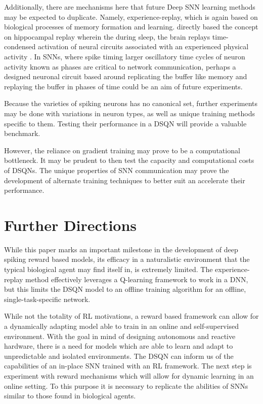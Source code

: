 \documentclass[
]{article}
\begin{document}
Additionally, there are mechanisms here that future Deep SNN learning
methods may be expected to duplicate. Namely, experience-replay, which
is again based on biological processes of memory formation and learning.
\autocite{mnihHumanlevelControlDeep2015} directly based the concept on
hippocampal replay wherein the during sleep, the brain replays
time-condensed activation of neural circuits associated with an
experienced physical activity
\autocite{bendorBiasingContentHippocampal2012}\autocite{oneillPlayItAgain2010}.
In SNNs, where spike timing larger oscillatory time cycles of neuron
activity known as phases are critical to network communication, perhaps
a designed neuronal circuit based around replicating the buffer like
memory and replaying the buffer in phases of time could be an aim of
future experiments.

Because the varieties of spiking neurons has no canonical set, further
experiments may be done with variations in neuron types, as well as
unique training methods specific to them. Testing their performance in a
DSQN will provide a valuable benchmark.

However, the reliance on gradient training may prove to be a
computational bottleneck. It may be prudent to then test the capacity
and computational costs of DSQNs. The unique properties of SNN
communication may prove the development of alternate training techniques
to better suit an accelerate their performance.

\hypertarget{further-directions}{%
\section{Further Directions}\label{further-directions}}

While this paper marks an important milestone in the development of deep
spiking reward based models, its efficacy in a naturalistic environment
that the typical biological agent may find itself in, is extremely
limited. The experience-replay method effectively leverages a Q-learning
framework to work in a DNN, but this limits the DSQN model to an offline
training algorithm for an offline, single-task-specific network.

While not the totality of RL motivations, a reward based framework can
allow for a dynamically adapting model able to train in an online and
self-supervised environment. With the goal in mind of designing
autonomous and reactive hardware, there is a need for models which are
able to learn and adapt to unpredictable and isolated environments. The
DSQN can inform us of the capabilities of an in-place SNN trained with
an RL framework. The next step is experiment with reward mechanisms
which will allow for dynamic learning in an online setting. To this
purpose it is necessary to replicate the abilities of SNNs similar to
those found in biological agents.
\end{document}
